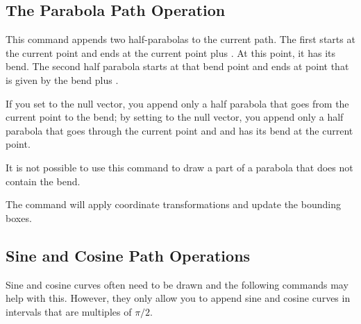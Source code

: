 \subsection{The Parabola Path Operation}

\begin{command}{\pgfpathparabola{}}
    This command appends two half-parabolas to the  current path. The first
    starts at the current point and ends at the current point plus . At this point, it has its bend. The second half parabola starts at
    that bend point and ends at point that is given by the bend plus .

    If you set  to the null vector, you append only a half
    parabola that goes from the current point to the bend; by setting
     to the null vector, you append only a half parabola that
    goes through the current point and  and has its bend at
    the current point.

    It is not possible to use this command to draw a part of a parabola that
    does not contain the bend.
\begin{codeexample}[]
\begin{pgfpicture}
  \pgfpathmoveto{\pgfpointorigin}
  \pgfpathparabola{\pgfpointorigin}{\pgfpoint{2cm}{4cm}}
  \color{red}

  \pgfpathmoveto{\pgfpointorigin}
  \pgfpathparabola{\pgfpoint{-2cm}{4cm}}{\pgfpointorigin}
  \color{blue}

  \pgfpathmoveto{\pgfpoint{-2cm}{2cm}}
  \pgfpathparabola{\pgfpoint{1cm}{-1cm}}{\pgfpoint{2cm}{4cm}}
  \color{orange}
\end{pgfpicture}
\end{codeexample}
    The command will apply coordinate transformations and update the bounding
    boxes.
\end{command}


\subsection{Sine and Cosine Path Operations}

Sine and cosine curves often need to be drawn and the following commands may
help with this. However, they only allow you to append sine and cosine curves
in intervals that are multiples of $\pi/2$.


